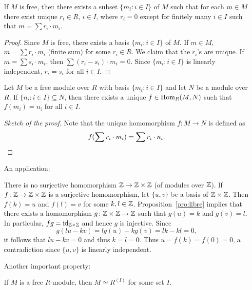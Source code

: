 \begin{proposition}
If $M$ is free, then there exists a subset $\{m_i:i\in I\}$ of $M$ 
such that for each $m\in M$ there exist unique $r_i\in R$, $i\in I$, 
where $r_i=0$ except for finitely many $i\in I$ 
such that $m=\sum r_i\cdot m_i$. 
\end{proposition}

\begin{proof}
Since $M$ is free, there exists a basis $\{m_i:i\in I\}$ of $M$. If $m\in M$,
$m=\sum r_i\cdot m_i$ (finite sum) for some $r_i\in R$. We claim that
the $r_i$'s are unique. If $m=\sum s_i\cdot m_i$, then
$\sum (r_i-s_i)\cdot m_i=0$. Since $\{m_i:i\in I\}$ 
is linearly independent, $r_i=s_i$ for all $i\in I$.  	
\end{proof}

\begin{proposition}
\label{pro:libre}
Let $M$ be a free module over $R$ with basis $\{m_i:i\in I\}$ and let $N$ be a module over $R$. 
If $\{n_i:i\in I\}\subseteq N$, then 
there exists a unique $f\in\operatorname{Hom}_R(M,N)$ such that
$f(m_i)=n_i$ for all $i\in I$.  
\end{proposition}

\begin{proof}[Sketch of the proof]
Note that the unique homomorphism $f\colon M\to N$ is defined as 
\[ 
f(\sum r_i\cdot m_i)=\sum r_i\cdot n_i.\qedhere 
\]
\end{proof}

An application:

\begin{example}
There is no surjective homomorphism $\mathbb{Z}\to\mathbb{Z}\times\mathbb{Z}$ (of modules over $\mathbb{Z}$). 
If $f\colon\mathbb{Z}\to\mathbb{Z}\times\mathbb{Z}$ is a surjective homomorphism, 
let $\{u,v\}$ be a basis of $\mathbb{Z}\times\mathbb{Z}$. Then $f(k)=u$ and $f(l)=v$ for some $k,l\in\mathbb{Z}$. Proposition~\ref{pro:libre} implies 
that there exists a homomorphism $g\colon\mathbb{Z}\times\mathbb{Z}\to\mathbb{Z}$ such that $g(u)=k$ and $g(v)=l$. 
In particular, $f g=\operatorname{id}_{\mathbb{Z}\times\mathbb{Z}}$ and hence 
$g$ is injective. Since  
\[
g(lu-kv)=lg(u)-kg(v)=lk-kl=0,
\]
it follows that $lu-kv=0$ and thus $k=l=0$. 
Thus $u=f(k)=f(0)=0$, a contradiction since 
$\{u,v\}$ is linearly
independent. 
\end{example}

Another important property:

\begin{proposition}
If $M$ is a free $R$-module, then $M\simeq R^{(I)}$ for some set $I$.
\end{proposition}

